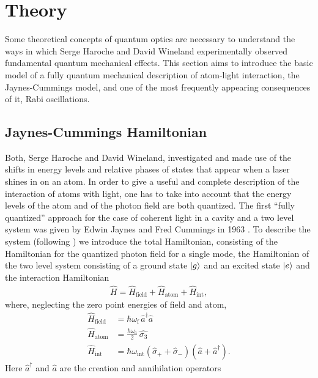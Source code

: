 \section{Theory}
\label{sec:Theory}
Some theoretical concepts of quantum optics are necessary to understand the ways
in which Serge Haroche and David Wineland experimentally observed fundamental
quantum mechanical effects. This section aims to introduce the basic model of a
fully quantum mechanical description of atom-light interaction, the Jaynes-Cummings model, and
one of the most frequently appearing consequences of it, Rabi oscillations.

\subsection{Jaynes-Cummings Hamiltonian}
Both, Serge Haroche and David Wineland, investigated and made use of the
shifts in energy levels and relative phases of states that appear when a laser
shines in on an atom.  In
order to give a useful and complete description of the interaction of atoms with
light, one has to take into
account that the energy levels of the atom and of the photon field are
both quantized. The first ``fully quantized'' approach for the case of coherent light
in a cavity and a two level system was given by Edwin Jaynes and Fred Cummings
in 1963 \cite{jaynes1963comparison}. To describe the system (following
\cite{gerry2005introductory}) 
we introduce the total Hamiltonian, consisting of the Hamiltonian for the 
 quantized photon field for a single mode, the Hamiltonian of the two level
 system consisting of a ground state $\ket{g}$ and an excited state $\ket{e}$ and the
 interaction Hamiltonian
\begin{align}
  \label{eq:JCM_H_tot}
  {\hat {H}}={\hat {H}}_{{{\text{field}}}}+{\hat {H}}_{{{\text{atom}}}}+{\hat
  {H}}_{{{\text{int}}}},
\end{align}
where, neglecting the zero point energies of field and atom,
\begin{align}
  \label{eq:JCM_H_field}
  \hat{H}_{\text{field}} &= \hbar \omega_{\text{f}}\, \hat{a}^\dagger
   \hat{a}\\
  \label{eq:JCM_H_atom}
  \hat{H}_{\text{atom}} &= \frac{\hbar \omega_a}{2} \, \hat{\sigma_3} \\
  \label{eq:JCM_H_int}
  \hat{H}_{\text{int}} &= \hbar \omega_{\text{int}} \left( \hat{\sigma}_+ +
\hat{\sigma}_-\right)\left(\hat{a} + \hat{a}^\dagger\right).
\end{align}
Here $\hat{a}^\dagger$ and $\hat{a}$ are the creation and annihilation operators
